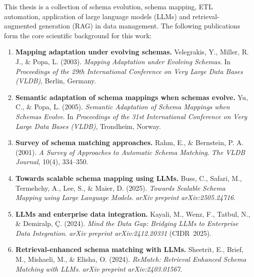 
\begin{blankpage}

    \noindent This thesis is a collection of schema evolution, schema mapping, ETL automation, application of large language models (LLMs) and retrieval-augmented generation (RAG) in data management. The following publications form the core scientific background for this work:

    \vspace{0.5cm}

    \begin{enumerate}
        \item \textbf{Mapping adaptation under evolving schemas.}  
        Velegrakis, Y., Miller, R. J., \& Popa, L. (2003). \emph{Mapping Adaptation under Evolving Schemas}. In \emph{Proceedings of the 29th International Conference on Very Large Data Bases (VLDB)}, Berlin, Germany.

        \item \textbf{Semantic adaptation of schema mappings when schemas evolve.}  
        Yu, C., \& Popa, L. (2005). \emph{Semantic Adaptation of Schema Mappings when Schemas Evolve}. In \emph{Proceedings of the 31st International Conference on Very Large Data Bases (VLDB)}, Trondheim, Norway.

        \item \textbf{Survey of schema matching approaches.}  
        Rahm, E., \& Bernstein, P. A. (2001). \emph{A Survey of Approaches to Automatic Schema Matching}. \emph{The VLDB Journal}, 10(4), 334--350.

        \item \textbf{Towards scalable schema mapping using LLMs.}  
        Buss, C., Safari, M., Termehchy, A., Lee, S., \& Maier, D. (2025). \emph{Towards Scalable Schema Mapping using Large Language Models}. \emph{arXiv preprint arXiv:2505.24716}.

        \item \textbf{LLMs and enterprise data integration.}  
        Kayali, M., Wenz, F., Tatbul, N., \& Demiralp, Ç. (2024). \emph{Mind the Data Gap: Bridging LLMs to Enterprise Data Integration}. \emph{arXiv preprint arXiv:2412.20331} (CIDR~2025).

        \item \textbf{Retrieval-enhanced schema matching with LLMs.}  
        Sheetrit, E., Brief, M., Mishaeli, M., \& Elisha, O. (2024). \emph{ReMatch: Retrieval Enhanced Schema Matching with LLMs}. \emph{arXiv preprint arXiv:2403.01567}.


\end{enumerate}
\end{blankpage}
